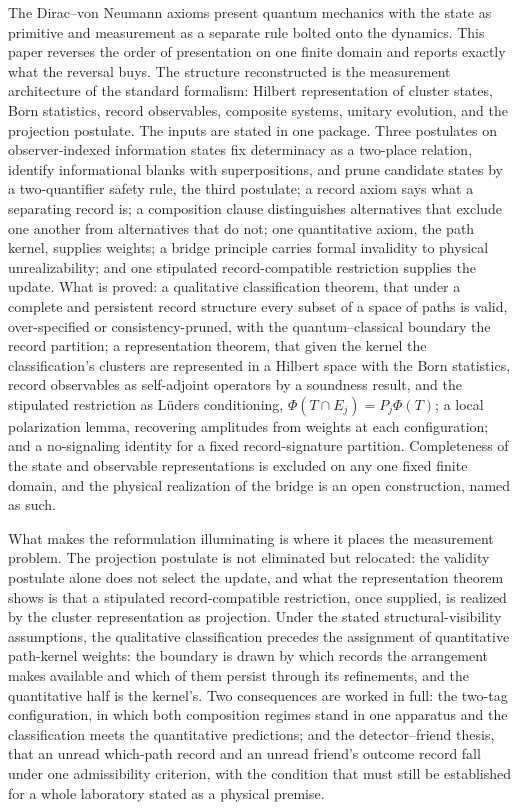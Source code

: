 The Dirac--von Neumann axioms present quantum mechanics with the state as primitive and measurement as a separate rule bolted onto the dynamics. This paper reverses the order of presentation on one finite domain and reports exactly what the reversal buys. The structure reconstructed is the measurement architecture of the standard formalism: Hilbert representation of cluster states, Born statistics, record observables, composite systems, unitary evolution, and the projection postulate. The inputs are stated in one package. Three postulates on observer-indexed information states fix determinacy as a two-place relation, identify informational blanks with superpositions, and prune candidate states by a two-quantifier safety rule, the third postulate; a record axiom says what a separating record is; a composition clause distinguishes alternatives that exclude one another from alternatives that do not; one quantitative axiom, the path kernel, supplies weights; a bridge principle carries formal invalidity to physical unrealizability; and one stipulated record-compatible restriction supplies the update. What is proved: a qualitative classification theorem, that under a complete and persistent record structure every subset of a space of paths is valid, over-specified or consistency-pruned, with the quantum--classical boundary the record partition; a representation theorem, that given the kernel the classification's clusters are represented in a Hilbert space with the Born statistics, record observables as self-adjoint operators by a soundness result, and the stipulated restriction as L\"{u}ders conditioning, $\Phi(T \cap E_j) = P_j \Phi(T)$; a local polarization lemma, recovering amplitudes from weights at each configuration; and a no-signaling identity for a fixed record-signature partition. Completeness of the state and observable representations is excluded on any one fixed finite domain, and the physical realization of the bridge is an open construction, named as such.

What makes the reformulation illuminating is where it places the measurement problem. The projection postulate is not eliminated but relocated: the validity postulate alone does not select the update, and what the representation theorem shows is that a stipulated record-compatible restriction, once supplied, is realized by the cluster representation as projection. Under the stated structural-visibility assumptions, the qualitative classification precedes the assignment of quantitative path-kernel weights: the boundary is drawn by which records the arrangement makes available and which of them persist through its refinements, and the quantitative half is the kernel's. Two consequences are worked in full: the two-tag configuration, in which both composition regimes stand in one apparatus and the classification meets the quantitative predictions; and the detector--friend thesis, that an unread which-path record and an unread friend's outcome record fall under one admissibility criterion, with the condition that must still be established for a whole laboratory stated as a physical premise.


